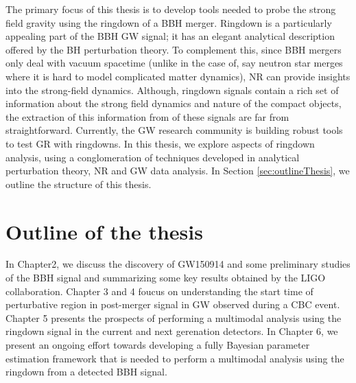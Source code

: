 The primary focus of this thesis is to develop tools needed to probe the strong field gravity using the ringdown of a BBH merger. Ringdown is a particularly appealing part of the BBH GW signal; it has an elegant analytical description offered by the BH  perturbation theory. To complement this,  since BBH mergers only deal with vacuum spacetime (unlike in the case of, say neutron star merges where it is hard to model complicated matter dynamics), NR can provide insights into the strong-field dynamics. Although, ringdown signals contain a rich set of information about the strong field dynamics and nature of the compact objects, the extraction of this information from of these signals are far from straightforward. Currently, the GW research community is building robust tools to test GR with ringdowns. In this thesis, we explore aspects of ringdown analysis,  using a conglomeration of techniques developed in analytical perturbation theory, NR and GW data analysis. In Section \ref{sec:outlineThesis}, we outline the structure of this thesis.






\section{Outline of the thesis}
\label{sec:outlineOfThesis}

In Chapter2, we discuss the discovery of GW150914 and some preliminary studies of the BBH signal and summarizing some key results obtained by the LIGO collaboration. Chapter 3 and 4 foucus on understanding the start time of perturbative region in post-merger signal in GW observed during a CBC event. Chapter 5 presents the prospects of performing a multimodal analysis using the ringdown signal in the current and next gerenation detectors. In Chapter 6, we present an ongoing effort towards developing a fully Bayesian parameter estimation framework that is needed to perform a multimodal analysis using the ringdown from a detected BBH signal. 


